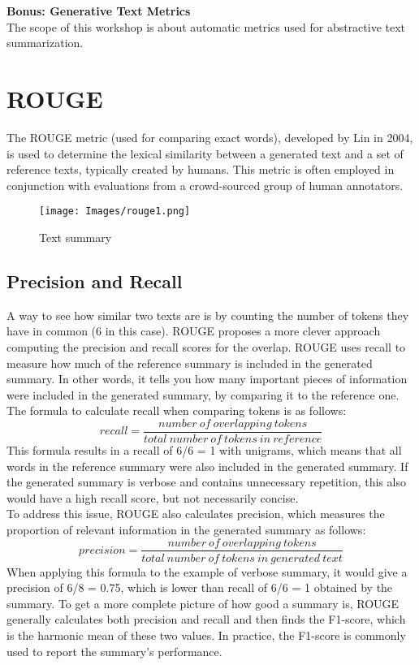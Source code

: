 {\large
\textbf{{\LARGE Bonus: Generative Text Metrics}}\\
The scope of this workshop is about automatic metrics used for abstractive text summarization.
\section{ROUGE}
The ROUGE metric (used for comparing exact words), developed by Lin in 2004, is used to determine the lexical similarity between a generated text and a set of reference texts, typically created by humans. This metric is often employed in conjunction with evaluations from a crowd-sourced group of human annotators.

\begin{figure}[h]
    \centering
    \texttt{[image: Images/rouge1.png]}
    \caption{Text summary}
    \label{fig:rouge1}
\end{figure}

\subsection{Precision and Recall} %
\noindent A way to see how similar two texts are is by counting the number of tokens they have in common (6 in this case). ROUGE proposes a more clever approach computing the precision and recall scores for the overlap. ROUGE uses recall to measure how much of the reference summary is included in the generated summary. In other words, it tells you how many important pieces of information were included in the generated summary, by comparing it to the reference one. The formula to calculate recall when comparing tokens is as follows: 
\[recall = \frac{number\ of\ overlapping\ tokens}{total\ number\ of\ tokens\ in\ reference}\] 
\noindent
This formula results in a recall of 6/6 = 1 with unigrams, which means that all words in the reference summary were also included in the generated summary. If the generated summary is verbose and contains unnecessary repetition, this also would have a high recall score, but not necessarily concise.\\

\noindent To address this issue, ROUGE also calculates precision, which measures the proportion of relevant information in the generated summary as follows: 
\[ precision = \frac{number\ of\ overlapping\ tokens}{total\ number\ of\ tokens\ in\ generated\ text}\] 
\noindent 
When applying this formula to the example of verbose summary, it would give a precision of 6/8 = 0.75, which is lower than recall of 6/6 = 1 obtained by the summary. To get a more complete picture of how good a summary is, ROUGE generally calculates both precision and recall and then finds the F1-score, which is the harmonic mean of these two values. In practice, the F1-score is commonly used to report the summary's performance.\\

}

